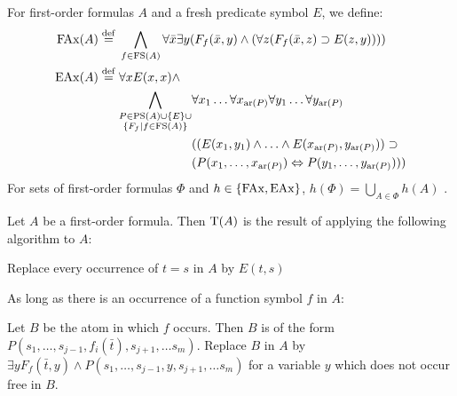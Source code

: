 \begin{defi}
	For first-order formulas $A$ and a fresh predicate symbol $E$, we define:\nopagebreak
	\begin{align*}
		\mathrm{FAx}(A) \stackrel{\mathrm{def}}{=}{} &\bigwedge_{f \in \mathrm{FS}(A)}  \forall \bar x \exists y (F_f(\bar x, y) \land (\forall z (F_f(\bar x, z) \supset E(z, y)))) \\
		\mathrm{EAx}(A) \stackrel{\mathrm{def}}{=}{} & \forall x E(x,x)\land  \\
																		 & \begin{aligned} \bigwedge_{\substack{P \in\mathrm{PS}(A)\cup\{E\}\cup\\ \{F_f\mid f\in \mathrm{FS}(A)\}}} &\forall x_1 \ldots \forall x_{\mathrm{ar}(P)} \forall y_1 \ldots \forall y_{\mathrm{ar}(P)} \\
																		 & (( E(x_1,y_1) \land \ldots \land E(x_{\mathrm{ar}(P)},  y_{\mathrm{ar}(P)})) \supset  \\
																 &  (P(x_1, \ldots, x_{\mathrm{ar}(P)}) \Leftrightarrow P(y_1, \ldots, y_{\mathrm{ar}(P)}) ) ) \end{aligned} 
\end{align*}
For sets of first-order formulas $\Phi$ and $h \in \{\mathrm{FAx}, \mathrm{EAx}\}$, $h(\Phi) = \bigcup_{A\in \Phi} h(A)$ .
\end{defi}

\begin{defi}
	Let $A$ be a first-order formula. Then $\mathrm{T}(A)$ is the result of applying the following algorithm to $A$:
	\begin{compactenum}
	\item Replace every occurrence of $t=s$ in $A$ by $E(t, s)$
	\item As long as there is an occurrence of a function symbol $f$ in $A$:

		Let $B$ be the atom in which $f$ occurs.
		\newline Then $B$ is of the form $P(s_1, \ldots, s_{j-1}, f_i(\bar t),\allowbreak s_{j+1}, \ldots s_m)$.
		\newline Replace $B$ in $A$ by $\exists y F_f(\bar t, y) \land P(s_1, \ldots, s_{j-1}, y, s_{j+1}, \ldots s_m)$ for a variable $y$ which does not occur free in $B$.
		\qedhere
	\end{compactenum}

\end{defi}


